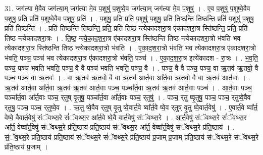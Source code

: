 \documentclass[17pt]{extarticle}
\begin{document}
31. जग॑त्या मे॒वैव जग॑त्या॒म् जग॑त्या मे॒व प॒शुषु॑ प॒शुष्वे॒व जग॑त्या॒म् जग॑त्या मे॒व प॒शुषु॑ । . ए॒व प॒शुषु॑ प॒शुष्वे॒वैव प॒शुषु॒ प्रति॒ प्रति॑ प॒शुष्वे॒वैव प॒शुषु॒ प्रति॑ । . प॒शुषु॒ प्रति॒ प्रति॑ प॒शुषु॑ प॒शुषु॒ प्रति॑ तिष्ठन्ति तिष्ठन्ति॒ प्रति॑ प॒शुषु॑ प॒शुषु॒ प्रति॑ तिष्ठन्ति । . प्रति॑ तिष्ठन्ति तिष्ठन्ति॒ प्रति॒ प्रति॑ तिष्ठ न्त्येकादशरा॒त्र ए॑कादशरा॒त्र स्ति॑ष्ठन्ति॒ प्रति॒ प्रति॑ तिष्ठ न्त्येकादशरा॒त्रः । . ति॒ष्ठ॒ न्त्ये॒का॒द॒श॒रा॒त्र ए॑कादशरा॒त्र स्ति॑ष्ठन्ति तिष्ठ न्त्येकादशरा॒त्रो भ॑वति भव त्येकादशरा॒त्र स्ति॑ष्ठन्ति तिष्ठ न्त्येकादशरा॒त्रो भ॑वति । . ए॒का॒द॒श॒रा॒त्रो भ॑वति भव त्येकादशरा॒त्र ए॑कादशरा॒त्रो भ॑वति॒ पञ्च॒ पञ्च॑ भव त्येकादशरा॒त्र ए॑कादशरा॒त्रो भ॑वति॒ पञ्च॑ । . ए॒का॒द॒श॒रा॒त्र इत्ये॑कादश - रा॒त्रः । . भ॒व॒ति॒ पञ्च॒ पञ्च॑ भवति भवति॒ पञ्च॒ वै वै पञ्च॑ भवति भवति॒ पञ्च॒ वै । . पञ्च॒ वै वै पञ्च॒ पञ्च॒ वा ऋ॒तव॑ ऋ॒तवो॒ वै पञ्च॒ पञ्च॒ वा ऋ॒तवः॑ । . वा ऋ॒तव॑ ऋ॒तवो॒ वै वा ऋ॒तव॑ आर्त॒वा आ᳚र्त॒वा ऋ॒तवो॒ वै वा ऋ॒तव॑ आर्त॒वाः । . ऋ॒तव॑ आर्त॒वा आ᳚र्त॒वा ऋ॒तव॑ ऋ॒तव॑ आर्त॒वाः पञ्च॒ पञ्चा᳚र्त॒वा ऋ॒तव॑ ऋ॒तव॑ आर्त॒वाः पञ्च॑ । . आ॒र्त॒वाः पञ्च॒ पञ्चा᳚र्त॒वा आ᳚र्त॒वाः पञ्च॒ र्‌तुष् वृ॒तुषु॒ पञ्चा᳚र्त॒वा आ᳚र्त॒वाः पञ्च॒ र्‌तुषु॑ । . पञ्च॒ र्‌तु ष्वृ॒तुषु॒ पञ्च॒ पञ्च॒ र्‌तुष्वे॒वैव र्‌तुषु॒ पञ्च॒ पञ्च॒ र्‌तुष्वे॒व । . ऋ॒तु ष्वे॒वैव र्‌तुष् वृ॒तु ष्वे॒वार्त॒वे ष्वा᳚र्त॒वे ष्वे॒व र्‌तुष् वृ॒तु ष्वे॒वार्त॒वेषु॑ । . ए॒वार्त॒वे ष्वा᳚र्त॒ वेष्वे॒ वैवार्त॒वेषु॑ संॅवथ्स॒रे सं॑ॅवथ्स॒र आ᳚र्त॒वे ष्वे॒वै वार्त॒वेषु॑ संॅवथ्स॒रे । . आ॒र्त॒वेषु॑ संॅवथ्स॒रे सं॑ॅवथ्स॒र आ᳚र्त॒ वेष्वा᳚र्त॒वेषु॑ संॅवथ्स॒रे प्र॑ति॒ष्ठाय॑ प्रति॒ष्ठाय॑ संॅवथ्स॒र आ᳚र्त॒ वेष्वा᳚र्त॒वेषु॑ संॅवथ्स॒रे प्र॑ति॒ष्ठाय॑ । . सं॒ॅव॒थ्स॒रे प्र॑ति॒ष्ठाय॑ प्रति॒ष्ठाय॑ संॅवथ्स॒रे सं॑ॅवथ्स॒रे प्र॑ति॒ष्ठाय॑ प्र॒जाम् प्र॒जाम् प्र॑ति॒ष्ठाय॑ संॅवथ्स॒रे सं॑ॅवथ्स॒रे प्र॑ति॒ष्ठाय॑ प्र॒जाम् । \newline
\end{document}
